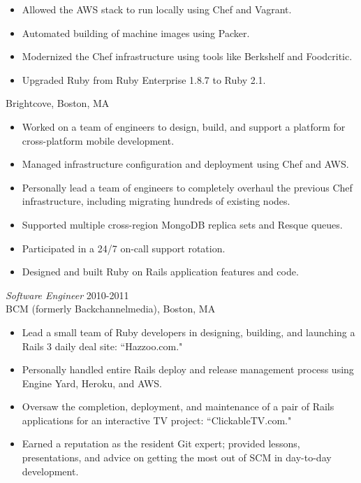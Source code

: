\documentclass[line,margin]{res}
\begin{document}
\begin{resume}
\begin{itemize}
    \vspace{-2.5mm} %
    \begin{itemize}  \itemsep -3pt %
      \item Allowed the AWS stack to run locally using Chef and Vagrant.
      \item Automated building of machine images using Packer.
      \item Modernized the Chef infrastructure using tools like Berkshelf and Foodcritic.
      \item Upgraded Ruby from Ruby Enterprise 1.8.7 to Ruby 2.1.
    \end{itemize}
  \end{itemize}
  
  \vspace{-4mm} %
  Brightcove,
  Boston, MA
  \begin{itemize}  \itemsep -2pt %
    \item Worked on a team of engineers to design, build, and support a platform for cross-platform mobile development.
    \item Managed infrastructure configuration and deployment using Chef and AWS.
    \item Personally lead a team of engineers to completely overhaul the previous Chef infrastructure, including migrating hundreds of existing nodes.
    \item Supported multiple cross-region MongoDB replica sets and Resque queues.
    \item Participated in a 24/7 on-call support rotation.
    \item Designed and built Ruby on Rails application features and code.
  \end{itemize}

  {\sl Software Engineer}  \hfill 2010-2011 \\
  BCM (formerly Backchannelmedia),
  Boston, MA
  \begin{itemize}  \itemsep -2pt %
    \item Lead a small team of Ruby developers in designing, building, and launching a Rails 3 daily deal site: ``Hazzoo.com."
    \item Personally handled entire Rails deploy and release management process using Engine Yard, Heroku, and AWS.
    \item Oversaw the completion, deployment, and maintenance of a pair of Rails applications for an interactive TV project: ``ClickableTV.com."
    \item Earned a reputation as the resident Git expert; provided lessons, presentations, and advice on getting the most out of SCM in day-to-day development.
  \end{itemize}


\end{resume}
\end{document}
